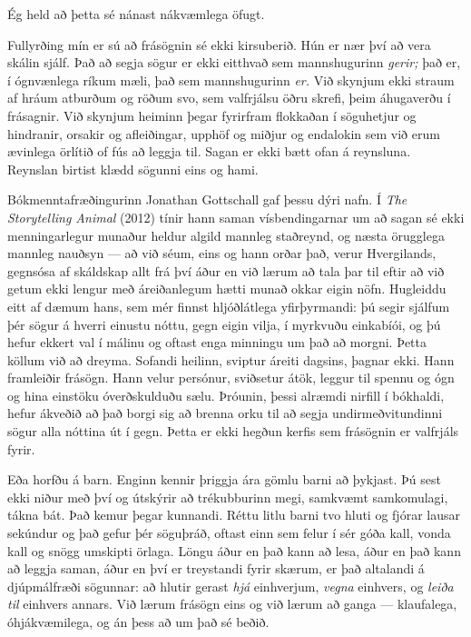 Ég held að þetta sé nánast nákvæmlega öfugt.

Fullyrðing mín er sú að frásögnin sé ekki kirsuberið. Hún er nær því að vera skálin sjálf. Það að segja sögur er ekki eitthvað sem mannshugurinn \emph{gerir;} það er, í ógnvænlega ríkum mæli, það sem mannshugurinn \emph{er.} Við skynjum ekki straum af hráum atburðum og röðum svo, sem valfrjálsu öðru skrefi, þeim áhugaverðu í frásagnir. Við skynjum heiminn þegar fyrirfram flokkaðan í söguhetjur og hindranir, orsakir og afleiðingar, upphöf og miðjur og endalokin sem við erum ævinlega örlítið of fús að leggja til. Sagan er ekki bætt ofan á reynsluna. Reynslan birtist klædd sögunni eins og hami.

Bókmenntafræðingurinn Jonathan Gottschall gaf þessu dýri nafn. Í \emph{The Storytelling Animal} (2012) tínir hann saman vísbendingarnar um að sagan sé ekki menningarlegur munaður heldur algild mannleg staðreynd, og næsta örugglega mannleg nauðsyn — að við séum, eins og hann orðar það, verur Hvergilands, gegnsósa af skáldskap allt frá því áður en við lærum að tala þar til eftir að við getum ekki lengur með áreiðanlegum hætti munað okkar eigin nöfn. Hugleiddu eitt af dæmum hans, sem mér finnst hljóðlátlega yfirþyrmandi: þú segir sjálfum þér sögur á hverri einustu nóttu, gegn eigin vilja, í myrkvuðu einkabíói, og þú hefur ekkert val í málinu og oftast enga minningu um það að morgni. Þetta köllum við að dreyma. Sofandi heilinn, sviptur áreiti dagsins, þagnar ekki. Hann framleiðir frásögn. Hann velur persónur, sviðsetur átök, leggur til spennu og ógn og hina einstöku óverðskulduðu sælu. Þróunin, þessi alræmdi nirfill í bókhaldi, hefur ákveðið að það borgi sig að brenna orku til að segja undirmeðvitundinni sögur alla nóttina út í gegn. Þetta er ekki hegðun kerfis sem frásögnin er valfrjáls fyrir.

Eða horfðu á barn. Enginn kennir þriggja ára gömlu barni að þykjast. Þú sest ekki niður með því og útskýrir að trékubburinn megi, samkvæmt samkomulagi, tákna bát. Það kemur þegar kunnandi. Réttu litlu barni tvo hluti og fjórar lausar sekúndur og það gefur þér söguþráð, oftast einn sem felur í sér góða kall, vonda kall og snögg umskipti örlaga. Löngu áður en það kann að lesa, áður en það kann að leggja saman, áður en því er treystandi fyrir skærum, er það altalandi á djúpmálfræði sögunnar: að hlutir gerast \emph{hjá} einhverjum, \emph{vegna} einhvers, og \emph{leiða til} einhvers annars. Við lærum frásögn eins og við lærum að ganga — klaufalega, óhjákvæmilega, og án þess að um það sé beðið.

